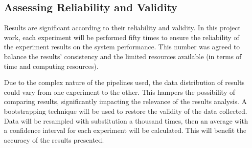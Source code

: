 \subsection{Assessing Reliability and Validity}
\label{subsec:reliability_validity}

Results are significant according to their reliability and validity. In this project work, each experiment will be performed fifty times to ensure the reliability of the experiment results on the system performance. This number was agreed to balance the results' consistency and the limited resources available (in terms of time and computing resources).

Due to the complex nature of the pipelines used, the data distribution of results could vary from one experiment to the other. This hampers the possibility of comparing results, significantly impacting the relevance of the results analysis. A bootstrapping technique will be used to restore the validity of the data collected. Data will be resampled with substitution a thousand times, then an average with a confidence interval for each experiment will be calculated. This will benefit the accuracy of the results presented.